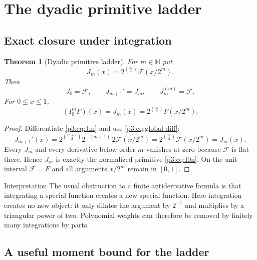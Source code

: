 \documentclass[11pt,oneside]{article}
\newtheorem{theorem}{Theorem}[section]
\theoremstyle{definition}
\theoremstyle{remark}
\newcommand{\N}{\mathbb N}
\newcommand{\1}{\mathbf 1}
\begin{document}
\section{The dyadic primitive ladder}
\label{p3:sec:ladder}

\subsection{Exact closure under integration}

\begin{theorem}[Dyadic primitive ladder]
\label{p3:thm:ladder}
For $m\in\N$ put
\begin{equation}
 J_m(x)=2^{\binom m2}\mathcal F(x/2^m).                       \label{p3:eq:Jm}
\end{equation}
Then
\begin{equation}
 J_0=\mathcal F,\qquad J_{m+1}'=J_m,\qquad J_m^{(m)}=\mathcal F.
 \label{p3:eq:J-ladder}
\end{equation}
For $0\le x\le1$,
\begin{equation}
 (I_0^mF)(x)=J_m(x)=2^{\binom m2}F(x/2^m).                    \label{p3:eq:F-nprimitive}
\end{equation}
\end{theorem}

\begin{proof}
Differentiate \eqref{p3:eq:Jm} and use \eqref{p3:eq:global-diff}:
\[
 J_{m+1}'(x)
 =2^{\binom{m+1}{2}}2^{-(m+1)}\,2\mathcal F(x/2^m)
 =2^{\binom m2}\mathcal F(x/2^m)=J_m(x).
\]
Every $J_m$ and every derivative below order $m$ vanishes at zero because $\mathcal F$ is
flat there.  Hence $J_m$ is exactly the normalized primitive \eqref{p3:eq:I0n}.  On the unit
interval $\mathcal F=F$ and all arguments $x/2^m$ remain in $[0,1]$.
\end{proof}

\begin{resultbox}{Interpretation}
The usual obstruction to a finite antiderivative formula is that integrating a special
function creates a new special function.  Here integration creates no new object: it only
dilates the argument by $2^{-1}$ and multiplies by a triangular power of two.  Polynomial
weights can therefore be removed by finitely many integrations by parts.
\end{resultbox}

\subsection{A useful moment bound for the ladder}
\end{document}
